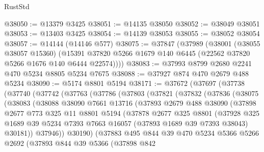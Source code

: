 \begin{lexlean}{RustStd}
\begin{coremodule}
@38050 := @13379 @3425
@38051 := @14135 @38050
@38052 := @38049 @38051
@38053 := @13403 @3425
@38054 := @14139 @38053
@38055 := @38052 @38054
@38057 := @14144 (@14146 @577)
@38075 := @37847
    (@37989
      (@38001
        (@38055 @38057 @15360)
        (@15391 @37820 @5266 @1679 @140 @6445 (@22562 @37820 @5266 @1676 @140 @6444 @22574))))
@38083 := @37993 @8799 @2680 @2241 @470 @5234 @8805 @5234 @7675
@38088 := @37927 @874 @470 @2679 @488 @5234
@38090 := @5174 @8801 @5194
@38171 := @37672
    (@37697
      (@37738
        (@37740
          (@37742
            (@37763
              (@37786
                (@37803
                  (@37821
                    (@37832
                      (@37836
                        (@38075
                          (@38083
                            (@38088
                              @38090
                              @7661
                              @13716
                              (@37893
                                @2679
                                @488
                                @38090
                                (@37898
                                  @2677
                                  @773
                                  @325
                                  @11
                                  @8801
                                  @5194
                                  (@37878
                                    @2677
                                    @325
                                    @8801
                                    (@37928
                                      @325
                                      @1689
                                      @39
                                      @5234
                                      @7393
                                      @7663
                                      @16057
                                      (@37893 @1689 @39 @7393 @38043)
                                      @30181))
                                  @37946))
                              @30190)
                            (@37883
                              @495
                              @844
                              @39
                              @470
                              @5234
                              @5366
                              @5266
                              @2692
                              (@37893
                                @844
                                @39
                                @5366
                                (@37898
                                  @842

\end{coremodule}
\end{lexlean}
